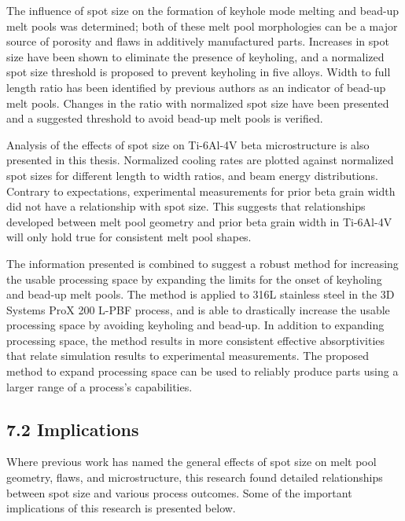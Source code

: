 \documentclass[10pt]{article}
\begin{document}
The influence of spot size on the formation of keyhole mode melting and bead-up melt pools was determined; both of these melt pool morphologies can be a major source of porosity and flaws in additively manufactured parts. Increases in spot size have been shown to eliminate the presence of keyholing, and a normalized spot size threshold is proposed to prevent keyholing in five alloys. Width to full length ratio has been identified by previous authors as an indicator of bead-up melt pools. Changes in the ratio with normalized spot size have been presented and a suggested threshold to avoid bead-up melt pools is verified.

Analysis of the effects of spot size on Ti-6Al-4V beta microstructure is also presented in this thesis. Normalized cooling rates are plotted against normalized spot sizes for different length to width ratios, and beam energy distributions. Contrary to expectations, experimental measurements for prior beta grain width did not have a relationship with spot size. This suggests that relationships developed between melt pool geometry and prior beta grain width in Ti-6Al-4V will only hold true for consistent melt pool shapes.

The information presented is combined to suggest a robust method for increasing the usable processing space by expanding the limits for the onset of keyholing and bead-up melt pools. The method is applied to 316L stainless steel in the 3D Systems ProX 200 L-PBF process, and is able to drastically increase the usable processing space by avoiding keyholing and bead-up. In addition to expanding processing space, the method results in more consistent effective absorptivities that relate simulation results to experimental measurements. The proposed method to expand processing space can be used to reliably produce parts using a larger range of a process's capabilities.

\subsection*{7.2 Implications}
Where previous work has named the general effects of spot size on melt pool geometry, flaws, and microstructure, this research found detailed relationships between spot size and various process outcomes. Some of the important implications of this research is presented below.
\end{document}
